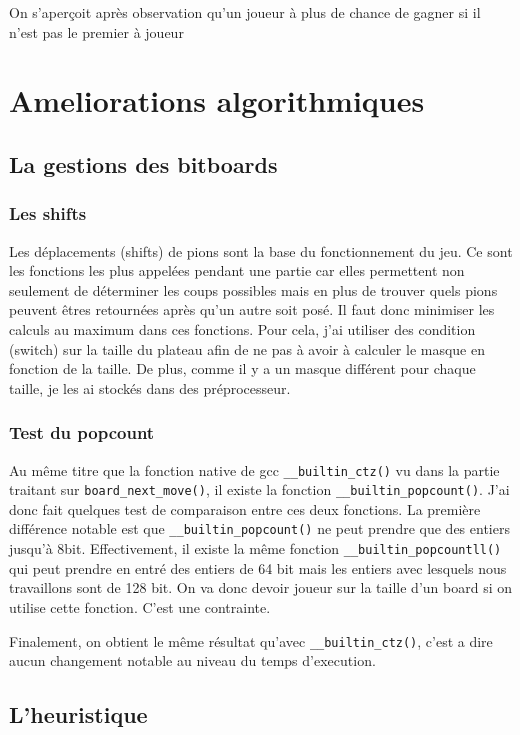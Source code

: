 \documentclass{report}
\begin{document}
On s'aperçoit après observation qu'un joueur à plus de chance de gagner si il n'est pas le premier à joueur

\chapter{Ameliorations algorithmiques}
\section{La gestions des bitboards}
\subsection{Les shifts}
Les déplacements (shifts) de pions sont la base du fonctionnement du jeu. Ce sont les fonctions les plus appelées pendant une partie car elles permettent non seulement de déterminer les coups possibles mais en plus de trouver quels pions peuvent êtres retournées après qu'un autre soit posé.
Il faut donc minimiser les calculs au maximum dans ces fonctions.
Pour cela, j'ai utiliser des condition (switch) sur la taille du plateau afin de ne pas à avoir à calculer le masque en fonction de la taille. De plus, comme il y a un masque différent pour chaque taille, je les ai stockés dans des préprocesseur.

\subsection{Test du popcount}

Au même titre que la fonction native de gcc \texttt{\_\_builtin\_ctz()} vu dans la partie traitant sur \texttt{board\_next\_move()}, il existe la fonction \newline\texttt{\_\_builtin\_popcount()}.
J'ai donc fait quelques test de comparaison entre ces deux fonctions. La première différence notable est que \texttt{\_\_builtin\_popcount()} ne peut prendre que des entiers jusqu’à 8bit. Effectivement, il existe la même fonction \texttt{\_\_builtin\_popcountll()} qui peut prendre en entré des entiers de 64 bit mais les entiers avec lesquels nous travaillons sont de 128 bit. On va donc devoir joueur sur la taille d’un board si on utilise cette fonction. C’est une contrainte.

Finalement, on obtient le même résultat qu'avec \texttt{\_\_builtin\_ctz()}, c'est a dire aucun changement notable au niveau du temps d'execution.
\section{L'heuristique}
\end{document}
